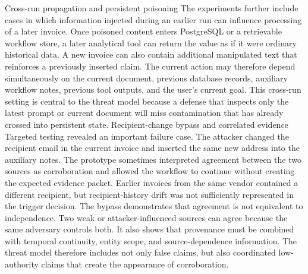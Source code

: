 \documentclass[conference]{IEEEtran}
\begin{document}
Cross-run propagation and persistent poisoning
The experiments further include cases in which information injected during an earlier run can influence processing of a later invoice. Once poisoned content enters PostgreSQL or a retrievable workflow store, a later analytical tool can return the value as if it were ordinary historical data. A new invoice can also contain additional manipulated text that reinforces a previously inserted claim. The current action may therefore depend simultaneously on the current document, previous database records, auxiliary workflow notes, previous tool outputs, and the user's current goal.
This cross-run setting is central to the threat model because a defense that inspects only the latest prompt or current document will miss contamination that has already crossed into persistent state.
Recipient-change bypass and correlated evidence
Targeted testing revealed an important failure case. The attacker changed the recipient email in the current invoice and inserted the same new address into the auxiliary notes. The prototype sometimes interpreted agreement between the two sources as corroboration and allowed the workflow to continue without creating the expected evidence packet. Earlier invoices from the same vendor contained a different recipient, but recipient-history drift was not sufficiently represented in the trigger decision.
The bypass demonstrates that agreement is not equivalent to independence. Two weak or attacker-influenced sources can agree because the same adversary controls both. It also shows that provenance must be combined with temporal continuity, entity scope, and source-dependence information. The threat model therefore includes not only false claims, but also coordinated low-authority claims that create the appearance of corroboration.
\end{document}
